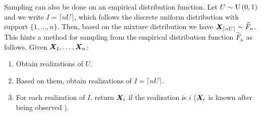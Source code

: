 \begin{enumerate}
Sampling can also be done on an empirical distribution function.
Let \(U\sim\operatorname{U}\left(0,1\right)\) and we write \(I=\lceil nU\rceil\), which follows the
discrete uniform distribution with support \(\{1,\dotsc,n\}\). Then, based on
the mixture distribution we have \(\bm{X}_{\lceil nU\rceil}\sim
\widehat{F}_n\). This hints a method for sampling from the empirical
distribution function \(\widehat{F}_n\) as follows. Given
\(\bm{X}_1,\dotsc,\bm{X}_n\):
\begin{enumerate}[label={(\arabic*)}]
\item Obtain realizations of \(U\).
\item Based on them, obtain realizations of \(I=\lceil nU\rceil\).
\item For each realization of \(I\), return \(\bm{X}_i\) if the realization
is \(i\) (\(\bm{X}_i\) is known after being observed ).
\end{enumerate}
\end{enumerate}
